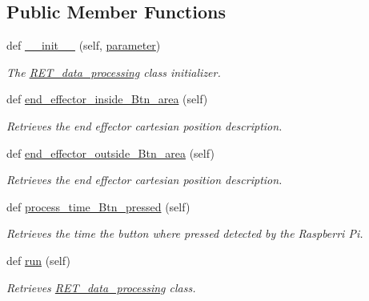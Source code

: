 \subsection*{Public Member Functions}
\begin{DoxyCompactItemize}
\item 
def \hyperlink{classRET__data__processing_1_1RET__data__processing_a297f3b1ee42e9ff40c0ec84bb5996ea5}{\+\_\+\+\_\+init\+\_\+\+\_\+} (self, \hyperlink{classRET__data__processing_1_1RET__data__processing_a0d71b5c1dcca8d3fee88d6a11d3e2071}{parameter})
\begin{DoxyCompactList}\small\item\em The \hyperlink{classRET__data__processing_1_1RET__data__processing}{R\+E\+T\+\_\+data\+\_\+processing} class initializer. \end{DoxyCompactList}\item 
def \hyperlink{classRET__data__processing_1_1RET__data__processing_a33b438266e6f03807f16bd4792855730}{end\+\_\+effector\+\_\+inside\+\_\+\+Btn\+\_\+area} (self)
\begin{DoxyCompactList}\small\item\em Retrieves the end effector cartesian position description. \end{DoxyCompactList}\item 
def \hyperlink{classRET__data__processing_1_1RET__data__processing_a5b693dc8f5167e8338541cc72ed583dc}{end\+\_\+effector\+\_\+outside\+\_\+\+Btn\+\_\+area} (self)
\begin{DoxyCompactList}\small\item\em Retrieves the end effector cartesian position description. \end{DoxyCompactList}\item 
def \hyperlink{classRET__data__processing_1_1RET__data__processing_af0d2380cd9fe71bf71ab9b25903cebc2}{process\+\_\+time\+\_\+\+Btn\+\_\+pressed} (self)
\begin{DoxyCompactList}\small\item\em Retrieves the time the button where pressed detected by the Raspberri Pi. \end{DoxyCompactList}\item 
def \hyperlink{classRET__data__processing_1_1RET__data__processing_ad22709b2e67308af35f55680d5a026e0}{run} (self)
\begin{DoxyCompactList}\small\item\em Retrieves \hyperlink{classRET__data__processing_1_1RET__data__processing}{R\+E\+T\+\_\+data\+\_\+processing} class. \end{DoxyCompactList}\item 

\end{DoxyCompactItemize}
